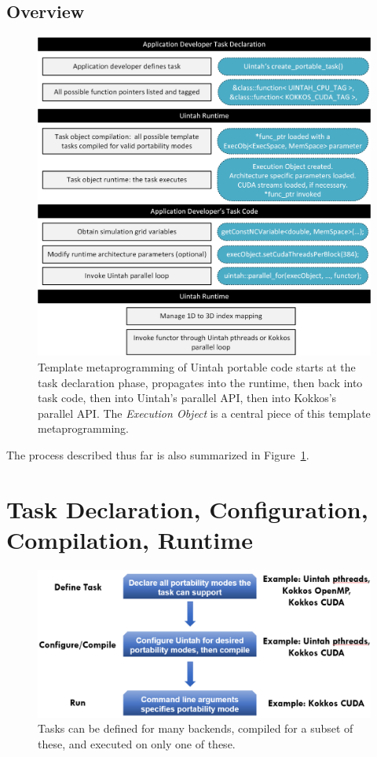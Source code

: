 \documentclass[]{article}
\begin{document}
\subsection{Overview}

\begin{figure}[h]
	\centerline{
		\includegraphics[width=1.0\textwidth,draft=false]{figures/template_metaprogramming.png}
	}
	\caption{Template metaprogramming of Uintah portable code starts at the task declaration phase, propagates into the runtime, then back into task code, then into Uintah's parallel API, then into Kokkos's parallel API.  The \emph{Execution Object} is a central piece of this template metaprogramming.} 
	\label{fig:template_metaprogramming}
\end{figure}

The process described thus far is also summarized in Figure~\ref{fig:template_metaprogramming}.

\section{Task Declaration, Configuration, Compilation, Runtime}

\begin{figure}[h]
	\centerline{
		\includegraphics[width=1.0\textwidth,draft=false]{figures/portable_flow.png}
	}
	\caption{Tasks can be defined for many backends, compiled for a subset of these, and executed on only one of these.} 
	\label{fig:portable_flow}
\end{figure}
\end{document}
